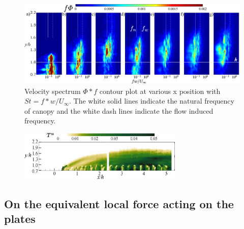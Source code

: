 \documentclass[lineno,authoryear]{FLO_v1}%
\theoremstyle{definition}
\begin{document}
\begin{figure}[]
	\centerline{\includegraphics[width=1\textwidth]{spec_piv}}
	\caption{Velocity spectrum $\Phi * f$ contour plot at various x position with $St = f * w / U_{\infty}$. The white solid lines indicate the natural frequency of canopy and the white dash lines indicate the flow induced frequency.}
	\label{flow_spectra}
\end{figure}

\begin{figure}[]
	\centerline{\includegraphics[width=0.7\textwidth]{auto}}
	\caption{}
	\label{auto}
\end{figure}

 


\subsection{On the equivalent local force acting on the plates}
\end{document}
